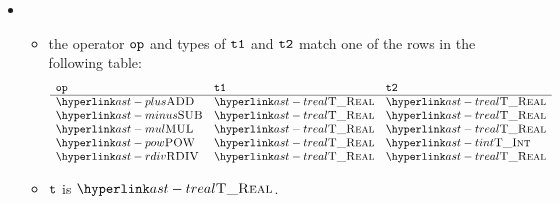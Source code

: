\begin{itemize}
  \item {}
  \begin{itemize}
    \item the operator $\texttt{op}$ and types of $\texttt{t1}$ and $\texttt{t2}$ match one of the rows in the following table:
    \[
    \begin{array}{lll}
      \mathbf{\op} & \mathbf{\vtone} & \mathbf{\vttwo} \\
      \hline
      \PLUS  & \TReal    & \TReal\\
      \MINUS & \TReal    & \TReal\\
      \MUL   & \TReal    & \TReal\\
      \POW   & \TReal    & \TInt\\
      \RDIV  & \TReal    & \TReal
    \end{array}
    \]
    \item $\texttt{t}$ is $\TReal$.
  \end{itemize}


\end{itemize}
